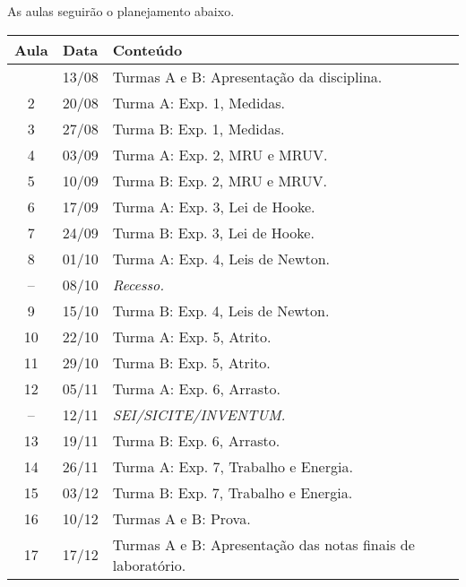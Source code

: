 As aulas seguirão o planejamento abaixo.
\begin{center}
\begin{longtable}{ccp{70mm}}
\toprule
Aula & Data & Conteúdo \\
\midrule
\endhead
\bottomrule
\endfoot
 1 & 13/08 & Turmas A e B: Apresentação da disciplina. \\
 2 & 20/08 & Turma A: Exp. 1, Medidas. \\
 3 & 27/08 & Turma B: Exp. 1, Medidas. \\
 4 & 03/09 & Turma A: Exp. 2, MRU e MRUV. \\ 
 5 & 10/09 & Turma B: Exp. 2, MRU e MRUV. \\
 6 & 17/09 & Turma A: Exp. 3, Lei de Hooke. \\
 7 & 24/09 & Turma B: Exp. 3, Lei de Hooke. \\
 8 & 01/10 & Turma A: Exp. 4, Leis de Newton. \\
-- & 08/10 & \emph{Recesso.}\\
 9 & 15/10 & Turma B: Exp. 4, Leis de Newton. \\
10 & 22/10 & Turma A: Exp. 5, Atrito. \\
11 & 29/10 & Turma B: Exp. 5, Atrito. \\
12 & 05/11 & Turma A: Exp. 6, Arrasto. \\
-- & 12/11 & \emph{SEI/SICITE/INVENTUM.} \\
13 & 19/11 & Turma B: Exp. 6, Arrasto. \\
14 & 26/11 & Turma A: Exp. 7, Trabalho e Energia. \\
15 & 03/12 & Turma B: Exp. 7, Trabalho e Energia. \\
16 & 10/12 & Turmas A e B: Prova. \\
17 & 17/12 & Turmas A e B: Apresentação das notas finais de laboratório. \\
\end{longtable}
\end{center}


\cleardoublepage
